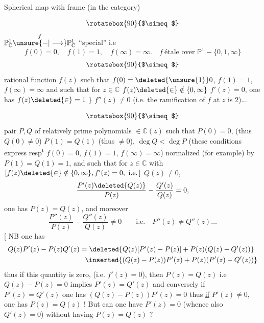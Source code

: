 Spherical map  with frame (in the  category)

\[
\rotatebox{90}{$\simeq$}
\]
 $\mathbb P^{1}_{\mathbb C}\overset{f}{\unsure{-|\longrightarrow}}\mathbb P^{1}_{\mathrm C}$ ``special'' i.e
\[
 f(0)=0,\quad f(1)=1,\quad f(\infty)=\infty.\quad f\ \text{étale over }\mathbb P^{1}-\{0,1,\infty\}
\]
\[
\rotatebox{90}{$\simeq$}
\]
rational function $f(z)$ such that $f(0)=\deleted{\unsure{1}}0$, $f(1)=1$, $f(\infty)=\infty$ and such that for $z\in\mathbb C$  $f(z)\deleted{\in}\notin\{0,\infty\}$ $f'(z)=0$, one has $f(z)\deleted{\in}=1$ $\}$  $f''(z)\ne0$ (i.e. the ramification of $f$ at $z$ is $2$)\ldots.

\[
\rotatebox{90}{$\simeq$}
\]
pair $P,Q$ \inserted{$[f=P/Q\quad !\,]$} of relatively prime polynomials $\in\mathbb C(z)$  such that $P(0)=0$, (thus $Q(0)\ne0$) $P(1)=Q(1)$ (thus $\ne0$), $\deg Q<\deg P$ (these conditions express resp\textsuperscript{t} $f(0)=0$, $f(1)=1$, $f(\infty)=\infty$)
normalized (for example) by $P(1)=Q(1)=1$, and such that for $z\in\mathbb C$ with $[f(z)\deleted{\in}\notin\{0,\infty\}, f'(z)=0,\ \mathrm{i.e.}\,]$  $Q(z)\ne0$,
\[
 \frac{P'(z)\deleted{Q(z)}}{P(z)}-\frac{Q'(z)}{Q(z)}=0,
\]
one has $P(z)=Q(z)$, and moreover
\[
 \frac{P''(z)}{P(z)}-\frac{Q''(z)}{Q(z)}\ne0\qquad\text{i.e.}\quad P''(z)\ne Q''(z)\ldots
\]
[ NB one has
\[
\begin{aligned}
 Q(z)P'(z)-P(z)Q'(z)&=\deleted{Q(z)[P'(z)-P(z)]+P(z)(Q(z)-Q'(z))}\\
 &\phantom{=}\inserted{(Q(z)-P(z))P'(z)+P(z)(P'(z)-Q'(z))}
\end{aligned}
\]
thus if  this quantity is zero, (i.e. $f'(z)=0$), then $P(z)=Q(z)$  i.e $Q(z)-P(z)=0$ implies $P'(z)=Q'(z)$ and conversely if $P'(z)=Q'(z)$ one has $(Q(z)-P(z))P'(z)=0$ thus \uline{if} $P'(z)\ne0$, one has $P(z)=Q(z)$ ! But can one have $P'(z)=0$ (whence also $Q'(z)=0$) \unsure{$\}$|)} without having $P(z)=Q(z)$ ?


